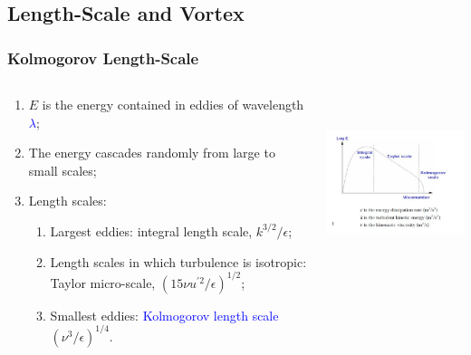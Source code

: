 \documentclass[10pt,compress]{beamer}
\newcommand{\blue}{\textcolor{blue}}
\begin{document}
\subsection{Length-Scale and Vortex}
\begin{frame}
 \frametitle{Kolmogorov Length-Scale}
  \begin{columns}
    \begin{column}[l]{0.5\linewidth}
       \begin{enumerate}%
           \item<1-> $E$ is the energy contained in eddies of wavelength \blue{$\lambda$};
           \item<1-> The energy cascades randomly from large to small scales;
           \item<2-> Length scales:
              \begin{enumerate}%
                  \item<2-> Largest eddies: integral length scale, $k^{3/2}/\epsilon$;
                  \item<2-> Length scales in which turbulence is isotropic: Taylor micro-scale, $\left(15\nu u^{\prime 2}/\epsilon\right)^{1/2}$;
                  \item<2-> Smallest eddies: \blue{Kolmogorov length scale} $\left(\nu^{3}/\epsilon\right)^{1/4}$.
              \end{enumerate}
       \end{enumerate} 
    \end{column}
    \begin{column}[l]{0.5\linewidth}
      \begin{center}
        \includegraphics[width=7.cm, height=5cm, clip]{./Figs/Kolmogorov1}
      \end{center}
    \end{column}

  \end{columns}

\end{frame}
\end{document}
